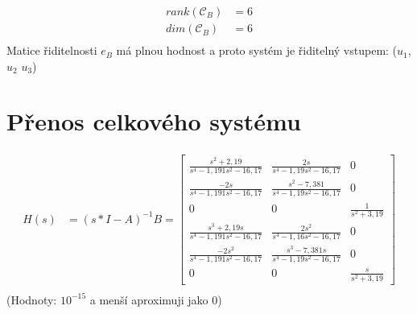 \documentclass{article}
\newcommand\mat[1]{\begin{bmatrix}#1\end{bmatrix}}
\begin{document}
\begin{align*}
    rank(\mathcal{C}_B) &= 6\\
    dim(\mathcal{C}_B) &= 6\\    
\end{align*}
Matice řiditelnosti $e_B$ má plnou hodnost a proto systém je řiditelný vstupem: ($u_1$, $u_2$ $u_3$)\\




\section{Přenos celkového systému}
\begin{align*}
    H(s) &= (s*I-A)^{-1}B = \mat{\frac{s^2+2,19}{s^4-1,191s^2-16,17} & \frac{2s}{s^4-1,19s^2-16,17} & 0\\
                 \frac{-2s}{s^4-1,191s^2-16,17} & \frac{s^2-7,381}{s^4-1,19s^2-16,17} & 0\\
                 0 & 0 & \frac{1}{s^2+3,19}\\
                 \frac{s^3+2,19s}{s^4-1,191s^2-16,17} & \frac{2s^2}{s^4-1,16s^2-16,17} & 0\\
                 \frac{-2s^2}{s^4-1,191s^2-16,17} & \frac{s^3-7,381s}{s^4-1,19s^2-16,17} & 0\\
                 0 & 0 & \frac{s}{s^2+3,19}}\\
\end{align*}
(Hodnoty: $10^{-15}$ a menší aproximuji jako 0)
\end{document}

